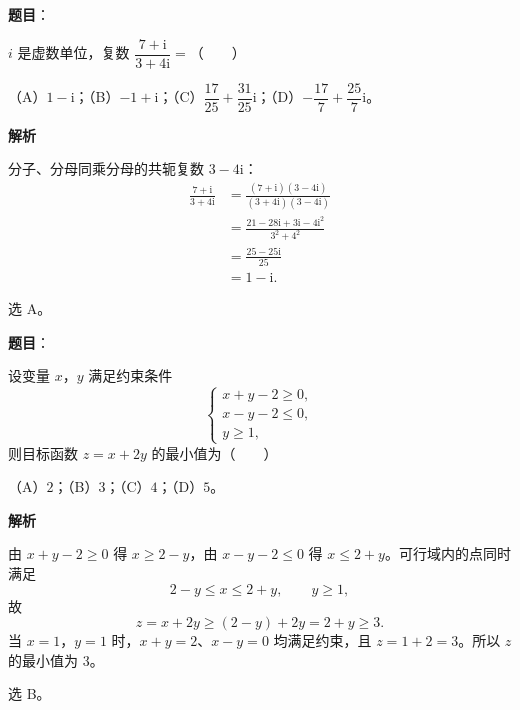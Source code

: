 

\begin{answer}

\textbf{题目}：

$i$ 是虚数单位，复数 $\dfrac{7+\mathrm i}{3+4\mathrm i}=$\mbox{（　　）}

（A）$1-\mathrm i$；（B）$-1+\mathrm i$；（C）$\dfrac{17}{25}+\dfrac{31}{25}\mathrm i$；（D）$-\dfrac{17}{7}+\dfrac{25}{7}\mathrm i$。

\textbf{解析}

分子、分母同乘分母的共轭复数 $3-4\mathrm i$：
\nopagebreak[4]
\[\begin{aligned}
\frac{7+\mathrm i}{3+4\mathrm i}
&=\frac{(7+\mathrm i)(3-4\mathrm i)}{(3+4\mathrm i)(3-4\mathrm i)}\\
&=\frac{21-28\mathrm i+3\mathrm i-4\mathrm i^2}{3^2+4^2}\\
&=\frac{25-25\mathrm i}{25}\\
&=1-\mathrm i .
\end{aligned}\]

选 A。


\end{answer}
\begin{answer}

\textbf{题目}：

设变量 $x$，$y$ 满足约束条件
\nopagebreak[4]
\[\begin{cases}
x+y-2\geqslant 0,\\
x-y-2\leqslant 0,\\
y\geqslant 1,
\end{cases}\]
则目标函数 $z=x+2y$ 的最小值为\mbox{（　　）}

（A）$2$；（B）$3$；（C）$4$；（D）$5$。

\textbf{解析}

由 $x+y-2\geqslant 0$ 得 $x\geqslant 2-y$，由 $x-y-2\leqslant 0$ 得 $x\leqslant 2+y$。可行域内的点同时满足
\nopagebreak[4]
\[2-y\leqslant x\leqslant 2+y,\qquad y\geqslant 1,\]
故
\nopagebreak[4]
\[z=x+2y\geqslant (2-y)+2y=2+y\geqslant 3.\]
当 $x=1$，$y=1$ 时，$x+y=2$、$x-y=0$ 均满足约束，且 $z=1+2=3$。所以 $z$ 的最小值为 $3$。

选 B。


\end{answer}
